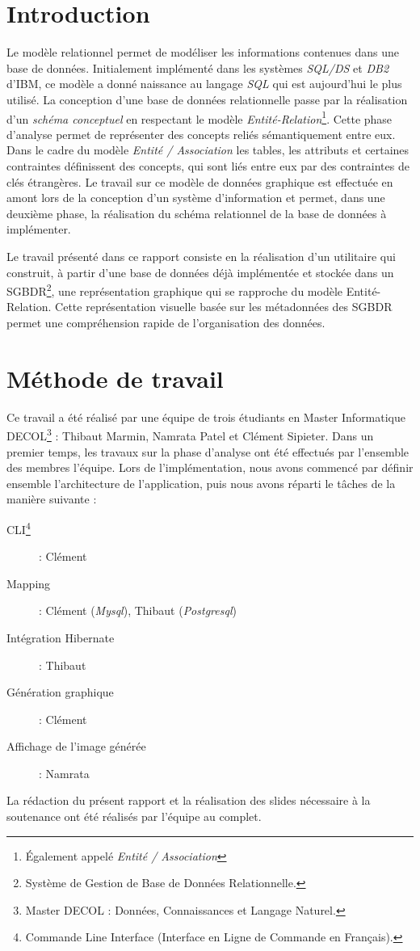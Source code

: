 \chapter*{Introduction}
Le modèle relationnel permet de modéliser les informations contenues dans une base de données. Initialement implémenté dans les systèmes \emph{SQL/DS} et \emph{DB2} d'IBM, ce modèle a donné naissance au langage \emph{SQL} qui est aujourd'hui le plus utilisé. La conception d'une base de données relationnelle passe par la réalisation d'un \emph{schéma conceptuel} en respectant le modèle  \emph{Entité-Relation}\footnote{Également appelé \emph{Entité / Association}}. Cette phase d'analyse permet de représenter des concepts reliés sémantiquement entre eux. Dans le cadre du modèle \emph{Entité / Association} les tables, les attributs et certaines contraintes définissent des concepts, qui sont liés entre eux par des contraintes de clés étrangères. Le travail sur ce modèle de données graphique est effectuée en amont lors de la conception d'un système d'information et permet, dans une deuxième phase, la réalisation du schéma relationnel de la base de données à implémenter.

Le travail présenté dans ce rapport consiste en la réalisation d'un utilitaire qui construit, à partir d'une base de données déjà implémentée et stockée dans un SGBDR\footnote{Système de Gestion de Base de Données Relationnelle.}, une représentation graphique qui se rapproche du modèle Entité-Relation. Cette représentation visuelle basée sur les métadonnées des SGBDR permet une compréhension rapide de l'organisation des données.

\clearemptydoublepage
\chapter*{Méthode de travail}
Ce travail a été réalisé par une équipe de trois étudiants en Master Informatique DECOL\footnote{Master DECOL : Données, Connaissances et Langage Naturel.} : Thibaut Marmin, Namrata Patel et Clément Sipieter. Dans un premier temps, les travaux sur la phase d'analyse ont été effectués par l'ensemble des membres l'équipe. Lors de l'implémentation, nous avons commencé par définir ensemble l'architecture de l'application, puis nous avons réparti le tâches de la manière suivante : 

\begin{description}
\item[CLI\footnote{Commande Line Interface (\og Interface en Ligne de Commande \fg{} en Français).}] : Clément
\item[Mapping] : Clément (\emph{Mysql}), Thibaut (\emph{Postgresql})
\item[Intégration Hibernate] : Thibaut
\item[Génération graphique] : Clément
\item[Affichage de l'image générée] : Namrata
\end{description}

La rédaction du présent rapport et la réalisation des slides nécessaire à la soutenance ont été réalisés par l'équipe au complet.
